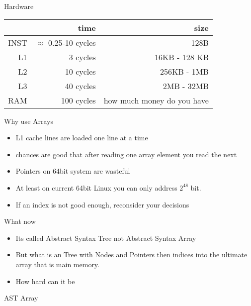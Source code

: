 \documentclass[aspectratio=169,notes]{beamer}
\begin{document}
	\begin{frame}[fragile]{Hardware}
		\centering
		\begin{tabular}{r r r}
				& time & size \\ \hline
		   INST & $\approx{}$ 0.25-10 cycles & 128B \\
\pause
			L1 & 3 cycles & 16KB - 128 KB \\
			L2 & 10 cycles & 256KB - 1MB \\
			L3 & 40 cycles & 2MB - 32MB \\
		   RAM & 100 cycles & how much money do you have
		\end{tabular}

	\end{frame}

	\begin{frame}[fragile]{Why use Arrays}
		\begin{itemize}
			\item L1 cache lines are loaded one line at a time
			\item chances are good that after reading one array element you read the next
			\item Pointers on 64bit system are wasteful
			\item At least on current 64bit Linux you can only address $2^{48}$ bit.
			\pause
			\vspace{1cm}
			\item If an \lstinline@uint@ index is not good enough, reconsider
your decisions
		\end{itemize}
	\end{frame}

	\begin{frame}[fragile]{What now}
		\begin{itemize}
			\item Its called Abstract Syntax Tree not Abstract Syntax Array
			\pause
			\vspace{1cm}
			\item But what is an Tree with Nodes and Pointers then indices into the
ultimate array that is main memory.
			\pause
			\vspace{1cm}
			\item How hard can it be
		\end{itemize}
	\end{frame}

	\begin{frame}[fragile]{AST Array}
		
	\end{frame}
\end{document}
